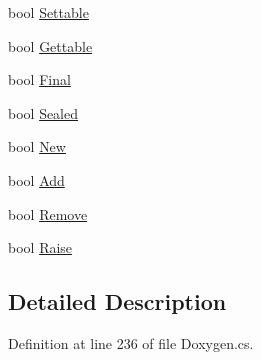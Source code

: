 \begin{DoxyCompactItemize}
\item 
bool \hyperlink{class_software_engineering_tools_1_1_documentation_1_1_dox_member_a86aa36a2a0fedb126b3ea28a3f15cb99}{Settable}
\item 
bool \hyperlink{class_software_engineering_tools_1_1_documentation_1_1_dox_member_a15a1af098da781facc9b519a4b9e59d2}{Gettable}
\item 
bool \hyperlink{class_software_engineering_tools_1_1_documentation_1_1_dox_member_acbbd2c091cfc64128719320a1839444f}{Final}
\item 
bool \hyperlink{class_software_engineering_tools_1_1_documentation_1_1_dox_member_af4888e13a3903de283573176fff0456f}{Sealed}
\item 
bool \hyperlink{class_software_engineering_tools_1_1_documentation_1_1_dox_member_a1abb4ca84b97c69c8a03e3d4c1944b10}{New}
\item 
bool \hyperlink{class_software_engineering_tools_1_1_documentation_1_1_dox_member_ad343e6c7bcd05756ce2c32b737a67634}{Add}
\item 
bool \hyperlink{class_software_engineering_tools_1_1_documentation_1_1_dox_member_ac7a045bbb7c9e46cf9d05d33ddba4d7b}{Remove}
\item 
bool \hyperlink{class_software_engineering_tools_1_1_documentation_1_1_dox_member_a5c7171ec293e53085550a9a15917b846}{Raise}
\end{DoxyCompactItemize}


\subsection{Detailed Description}


Definition at line 236 of file Doxygen.\+cs.



